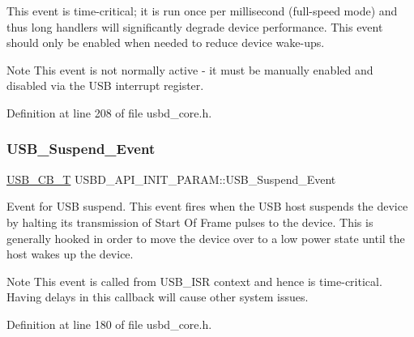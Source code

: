 This event is time-\/critical; it is run once per millisecond (full-\/speed mode) and thus long handlers will significantly degrade device performance. This event should only be enabled when needed to reduce device wake-\/ups.

\begin{DoxyNote}{Note}
This event is not normally active -\/ it must be manually enabled and disabled via the U\+SB interrupt register. ~\newline
~\newline

\end{DoxyNote}


Definition at line 208 of file usbd\+\_\+core.\+h.

\mbox{\label{struct_u_s_b_d___a_p_i___i_n_i_t___p_a_r_a_m_a3c256417cf3bdd576029d29787d6046f}} 
\subsubsection{\texorpdfstring{U\+S\+B\+\_\+\+Suspend\+\_\+\+Event}{USB\_Suspend\_Event}}
{\footnotesize\ttfamily \hyperlink{group___u_s_b_d___core_ga0404ce046312aa5c798cc4a05c417e46}{U\+S\+B\+\_\+\+C\+B\+\_\+T} U\+S\+B\+D\+\_\+\+A\+P\+I\+\_\+\+I\+N\+I\+T\+\_\+\+P\+A\+R\+A\+M\+::\+U\+S\+B\+\_\+\+Suspend\+\_\+\+Event}

Event for U\+SB suspend. This event fires when the U\+SB host suspends the device by halting its transmission of Start Of Frame pulses to the device. This is generally hooked in order to move the device over to a low power state until the host wakes up the device. ~\newline
\begin{DoxyNote}{Note}
This event is called from U\+S\+B\+\_\+\+I\+SR context and hence is time-\/critical. Having delays in this callback will cause other system issues. 
\end{DoxyNote}


Definition at line 180 of file usbd\+\_\+core.\+h.

